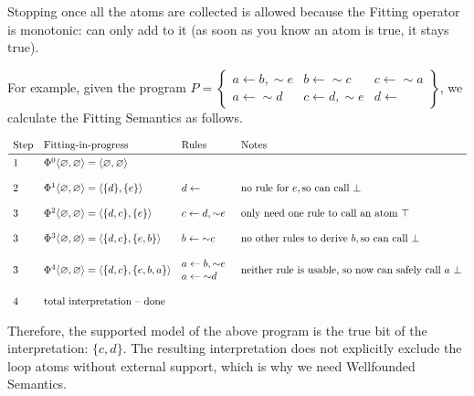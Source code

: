 \documentclass[9pt,a4paper,landscape]{article}
\begin{document}
{Stopping once all the atoms are collected is allowed because the Fitting operator is monotonic: can only add to it (as soon as you know an atom is true, it stays true).

For example, given the program $P = \left\{\begin{array}{lll}
a \leftarrow b, {\sim} e & b \leftarrow {\sim} c & c \leftarrow {\sim} a \\
a \leftarrow {\sim} d & c \leftarrow d, {\sim} e & d \leftarrow
\end{array}\right\}$, we calculate the Fitting Semantics as follows.

\begin{center}
	$\begin{array}{llll}
\text{Step} & \text{Fitting-in-progress} & \text{Rules} & \text{Notes} \\ \midrule
1 & \Phi^0 \langle \varnothing, \varnothing \rangle = \langle \varnothing, \varnothing \rangle && \\&\\
2 & \Phi^1 \langle \varnothing, \varnothing \rangle = \langle \{d\}, \{e\} \rangle & d \leftarrow & \text{no rule for}\ e, \text{so can call}\ \bot\\&\\
3 & \Phi^2 \langle \varnothing, \varnothing \rangle = \langle \{d, c\}, \{e\} \rangle & c \leftarrow d, {\sim} e & \text{only need one rule to call an atom}\ \top \\&\\
3 & \Phi^3 \langle \varnothing, \varnothing \rangle = \langle \{d, c\}, \{e, b\} \rangle & b \leftarrow {\sim} c & \text{no other rules to derive}\ b, \text{so can call}\ \bot \\&\\
3 & \Phi^4 \langle \varnothing, \varnothing \rangle = \langle \{d, c\}, \{e, b, a\} \rangle & \begin{array}{@{}l}
a \leftarrow b, {\sim} e\\
a \leftarrow {\sim} d
\end{array} & \text{neither rule is usable, so now can safely call}\ a\ \bot \\ &\\
4 & \text{total interpretation -- done}
\end{array}$
\end{center}

Therefore, the supported model of the above program is the true bit of the interpretation: $\{c, d\}$.
The resulting interpretation does not explicitly exclude the loop atoms without external support, which is why we need Wellfounded Semantics.

}
\end{document}
